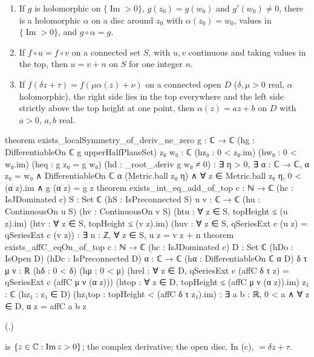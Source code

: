 \begin{theorem}\label{ch19:thm:localtop}
\begin{enumerate}[label=(\alph*)]
\item If $g$ is holomorphic on $\{\operatorname{Im}>0\}$, $g(z_0)=g(w_0)$ and $g'(w_0)\ne0$, there is a holomorphic $\alpha$ on a disc
  around $z_0$ with $\alpha(z_0)=w_0$, values in $\{\operatorname{Im}>0\}$, and $g\circ\alpha=g$.
\item If $f\circ u=f\circ v$ on a connected set $S$, with $u,v$ continuous and taking values in the top, then $u=v+n$ on $S$ for one
  integer $n$.
\item If $f(\delta z+\tau)=f(\mu\alpha(z)+\nu)$ on a connected open $D$ ($\delta,\mu>0$ real, $\alpha$ holomorphic), the right side lies in the
  top everywhere and the left side strictly above the top height at one point, then $\alpha(z)=az+b$ on $D$ with $a>0$, $a,b$ real.
\end{enumerate}
\end{theorem}
\begin{leancode}
theorem exists_localSymmetry_of_deriv_ne_zero {g : ℂ → ℂ}
    (hg : DifferentiableOn ℂ g upperHalfPlaneSet) {z₀ w₀ : ℂ} (hz₀ : 0 < z₀.im)
    (hw₀ : 0 < w₀.im) (heq : g z₀ = g w₀) (hd : _root_.deriv g w₀ ≠ 0) :
    ∃ η > 0, ∃ α : ℂ → ℂ, α z₀ = w₀ ∧ DifferentiableOn ℂ α (Metric.ball z₀ η) ∧
      ∀ z ∈ Metric.ball z₀ η, 0 < (α z).im ∧ g (α z) = g z
theorem exists_int_eq_add_of_top {c : ℕ → ℂ} (hc : IsJDominated c) {S : Set ℂ}
    (hS : IsPreconnected S) {u v : ℂ → ℂ} (hu : ContinuousOn u S) (hv : ContinuousOn v S)
    (htu : ∀ z ∈ S, topHeight ≤ (u z).im) (htv : ∀ z ∈ S, topHeight ≤ (v z).im)
    (huv : ∀ z ∈ S, qSeriesExt c (u z) = qSeriesExt c (v z)) :
    ∃ n : ℤ, ∀ z ∈ S, u z = v z + n
theorem exists_affC_eqOn_of_top {c : ℕ → ℂ} (hc : IsJDominated c) {D : Set ℂ} (hDo : IsOpen D)
    (hDc : IsPreconnected D) {α : ℂ → ℂ} (hα : DifferentiableOn ℂ α D) {δ τ μ ν : ℝ}
    (hδ : 0 < δ) (hμ : 0 < μ)
    (hrel : ∀ z ∈ D, qSeriesExt c (affC δ τ z) = qSeriesExt c (affC μ ν (α z)))
    (htop : ∀ z ∈ D, topHeight ≤ (affC μ ν (α z)).im) {z₁ : ℂ} (hz₁ : z₁ ∈ D)
    (hz₁top : topHeight < (affC δ τ z₁).im) :
    ∃ a b : ℝ, 0 < a ∧ ∀ z ∈ D, α z = affC a b z
\end{leancode}
(.)
\begin{dictionary}
 is $\{z\in{\mathbb{C}}:\operatorname{Im}z>0\}$;  the complex derivative;
 the open disc.  In (c),  $=\delta z+\tau$.
\end{dictionary}
